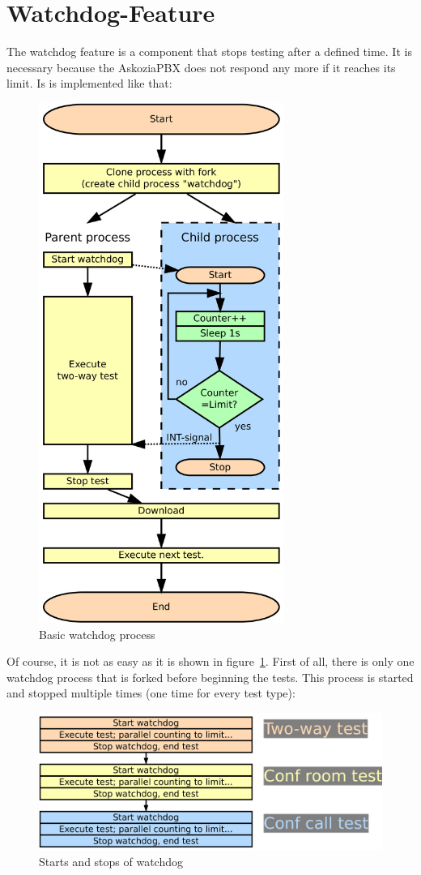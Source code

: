 \section{Watchdog-Feature}
\label{sec:watchdog}

The watchdog feature is a component that stops testing after a defined time. It is necessary because the AskoziaPBX does not respond
any more if it reaches its limit. Is is implemented like that:

\begin{figure} [!ht]
\centering
\includegraphics [width=8cm] {watchdog-1}
\caption{Basic watchdog process}
\label{fig:watchdog-basic-process}
\end{figure}

\newpage
Of course, it is not as easy as it is shown in figure~\ref{fig:watchdog-basic-process}. First of all,
there is only one watchdog process that is forked before beginning the tests.
This process is started and stopped multiple times (one time for every test type):

\begin{figure} [!ht]
\centering
\includegraphics [width=14cm] {watchdog-2}
\caption{Starts and stops of watchdog}
\end{figure}


